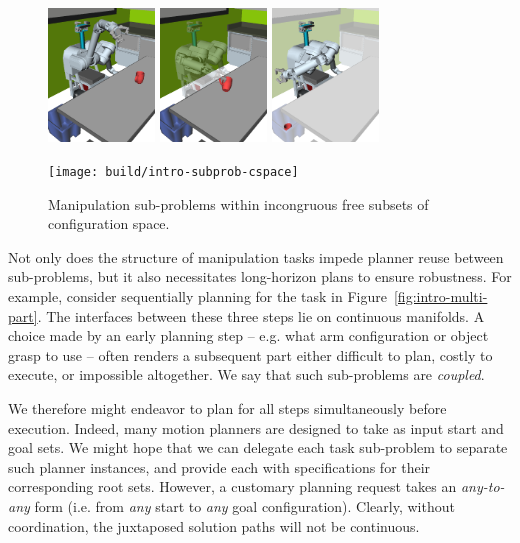 \begin{figure}[t]
   \centering
   \includegraphics[height=1.4in]{figs/testherb-b.png}%
   \quad%
   \includegraphics[height=1.4in]{figs/testherb-c.png}%
   \quad%
   \includegraphics[height=1.4in]{figs/testherb-d.png}
   
   \texttt{[image: build/intro-subprob-cspace]}
   \caption{Manipulation sub-problems
      within incongruous free subsets
      of configuration space.}
\end{figure}

Not only does the structure of manipulation tasks
impede planner reuse between sub-problems,
but it also necessitates long-horizon plans to ensure robustness.
For example,
consider sequentially planning for the task in
Figure~\ref{fig:intro-multi-part}.
The interfaces between these three steps lie on continuous manifolds.
A choice made by an early planning step
-- e.g. what arm configuration or object grasp to use --
often renders a subsequent part either difficult to plan,
costly to execute, or impossible altogether.
We say that such sub-problems are \emph{coupled}.

We therefore might endeavor to plan for all steps
simultaneously before execution.
Indeed,
many motion planners are designed to take as input
start and goal sets.
We might hope that we can delegate each task sub-problem to
separate such planner instances,
and provide each with specifications for their corresponding
root sets.
However,
a customary planning request takes an \emph{any-to-any} form
(i.e. from \emph{any} start to \emph{any} goal configuration).
Clearly, without coordination,
the juxtaposed solution paths will not be continuous.

